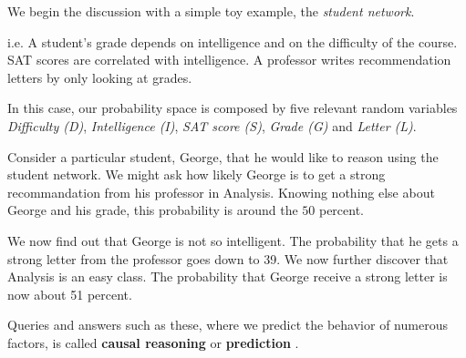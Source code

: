 We begin the discussion with a simple toy example, the \textit{student network}.
\begin{example}
    i.e. A student's grade depends on intelligence and on the difficulty of the course.
    SAT scores are correlated with intelligence. A professor writes recommendation letters by only looking at grades. \vspace{3.5pt}

    In this case, our probability space is composed by five relevant random variables \textit{Difficulty (D)}, \textit{Intelligence (I)}, \textit{SAT score (S)}, \textit{Grade (G)} and \textit{Letter (L)}.
    \begin{center}
    \end{center}
    Consider a particular student, George, that he would like to reason using the student network. We might ask how likely George is to get a strong recommandation from his professor in Analysis.
    Knowing nothing else about George and his grade, this probability is around the $50$ percent. \vspace{3.5pt}

    We now find out that George is not so intelligent. The probability that he gets a strong letter from the professor goes down to 39. We now further discover that Analysis is an easy class.
    The probability that George receive a strong letter is now about 51 percent. \vspace{3.5pt}

    Queries and answers such as these, where we predict the behavior of numerous factors, is called \textbf{causal reasoning} or \textbf{prediction} .
\end{example}
